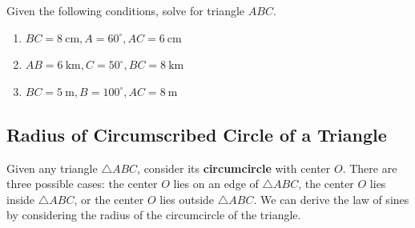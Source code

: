 \documentclass{report}
\begin{document}

Given the following conditions, solve for triangle $ABC$.
\vspace{-1em}
\begin{enumerate}
    \item $B C=8 \mathrm{~cm}, A=60^{\circ}, A C=6 \mathrm{~cm}$
    \item $A B=6 \mathrm{~km}, C=50^{\circ}, B C=8 \mathrm{~km}$
    \item $B C=5 \mathrm{~m}, B=100^{\circ}, A C=8 \mathrm{~m}$
\end{enumerate}

\subsection*{Radius of Circumscribed Circle of a Triangle}

Given any triangle $\triangle ABC$, consider its \textbf{circumcircle} with center $O$. There are three possible cases: the center $O$ lies on an edge of $\triangle ABC$, the center $O$ lies inside $\triangle ABC$, or the center $O$ lies outside $\triangle ABC$. We can derive the law of sines by considering the radius of the circumcircle of the triangle.
\end{document}
